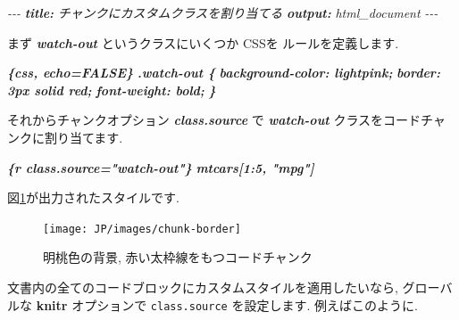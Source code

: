 \documentclass[
  11pt,
  lualatex,ja=standard,jafont=noto]{bxjsreport}
\newenvironment{Shaded}{\begin{snugshade}}{\end{snugshade}}
\newcommand{\AnnotationTok}[1]{\textcolor[rgb]{0.56,0.35,0.01}{\textbf{\textit{#1}}}}
\newcommand{\AttributeTok}[1]{\textcolor[rgb]{0.77,0.63,0.00}{#1}}
\newcommand{\CommentTok}[1]{\textcolor[rgb]{0.56,0.35,0.01}{\textit{#1}}}
\newcommand{\FunctionTok}[1]{\textcolor[rgb]{0.00,0.00,0.00}{#1}}
\newcommand{\InformationTok}[1]{\textcolor[rgb]{0.56,0.35,0.01}{\textbf{\textit{#1}}}}
\newcommand{\NormalTok}[1]{#1}
\newcommand{\SpecialCharTok}[1]{\textcolor[rgb]{0.00,0.00,0.00}{#1}}
\newcommand{\StringTok}[1]{\textcolor[rgb]{0.31,0.60,0.02}{#1}}
\begin{document}
\begin{Shaded}
\begin{Highlighting}[]
\CommentTok{{-}{-}{-}}
\AnnotationTok{title:}\CommentTok{ チャンクにカスタムクラスを割り当てる}
\AnnotationTok{output:}\CommentTok{ html\_document}
\CommentTok{{-}{-}{-}}

\NormalTok{まず }\InformationTok{\textasciigrave{}watch{-}out\textasciigrave{}}\NormalTok{ というクラスにいくつか CSSを ルールを定義します.}

\InformationTok{\textasciigrave{}\textasciigrave{}\textasciigrave{}\{css, echo=FALSE\}}
\InformationTok{.watch{-}out \{}
\InformationTok{  background{-}color: lightpink;}
\InformationTok{  border: 3px solid red;}
\InformationTok{  font{-}weight: bold;}
\InformationTok{\}}
\InformationTok{\textasciigrave{}\textasciigrave{}\textasciigrave{}}

\NormalTok{それからチャンクオプション }\InformationTok{\textasciigrave{}class.source\textasciigrave{}}\NormalTok{ で }\InformationTok{\textasciigrave{}watch{-}out\textasciigrave{}}\NormalTok{ クラスをコードチャンクに割り当てます.}

\InformationTok{\textasciigrave{}\textasciigrave{}\textasciigrave{}\{r class.source="watch{-}out"\}}
\InformationTok{mtcars[1:5, "mpg"]}
\InformationTok{\textasciigrave{}\textasciigrave{}\textasciigrave{}}
\end{Highlighting}
\end{Shaded}

図\ref{fig:chunk-border}が出力されたスタイルです.

\begin{figure}

{\centering \texttt{[image: JP/images/chunk-border]} 

}

\caption{明桃色の背景, 赤い太枠線をもつコードチャンク}\label{fig:chunk-border}
\end{figure}

文書内の全てのコードブロックにカスタムスタイルを適用したいなら, グローバルな \textbf{knitr} オプションで \texttt{class.source} を設定します. 例えばこのように.

\begin{Shaded}
\end{Shaded}
\end{document}
